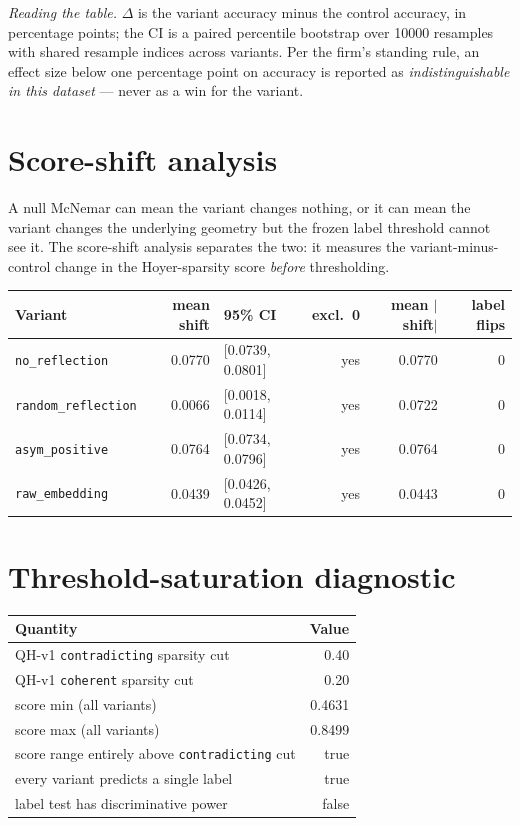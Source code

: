 \documentclass[11pt]{article}
\begin{document}
\noindent\textit{Reading the table.} $\Delta$ is the variant accuracy minus the control accuracy, in percentage points; the CI is a paired percentile bootstrap over 10000 resamples with shared resample indices across variants. Per the firm's standing rule, an effect size below one percentage point on accuracy is reported as \emph{indistinguishable in this dataset} --- never as a win for the variant.

\section{Score-shift analysis}
A null McNemar can mean the variant changes nothing, or it can mean the variant changes the underlying geometry but the frozen label threshold cannot see it. The score-shift analysis separates the two: it measures the variant-minus-control change in the Hoyer-sparsity score \emph{before} thresholding.

\begin{tabular}{l r l r r r}
\toprule
Variant & mean shift & 95\% CI & excl.\ 0 & mean $|$shift$|$ & label flips \\
\midrule
\texttt{no\_reflection} & 0.0770 & [0.0739, 0.0801] & yes & 0.0770 & 0 \\
\texttt{random\_reflection} & 0.0066 & [0.0018, 0.0114] & yes & 0.0722 & 0 \\
\texttt{asym\_positive} & 0.0764 & [0.0734, 0.0796] & yes & 0.0764 & 0 \\
\texttt{raw\_embedding} & 0.0439 & [0.0426, 0.0452] & yes & 0.0443 & 0 \\
\bottomrule
\end{tabular}

\section{Threshold-saturation diagnostic}
\begin{tabular}{l r}
\toprule
Quantity & Value \\
\midrule
QH-v1 \texttt{contradicting} sparsity cut & 0.40 \\
QH-v1 \texttt{coherent} sparsity cut & 0.20 \\
score min (all variants) & 0.4631 \\
score max (all variants) & 0.8499 \\
score range entirely above \texttt{contradicting} cut & true \\
every variant predicts a single label & true \\
label test has discriminative power & false \\
\bottomrule
\end{tabular}
\end{document}
